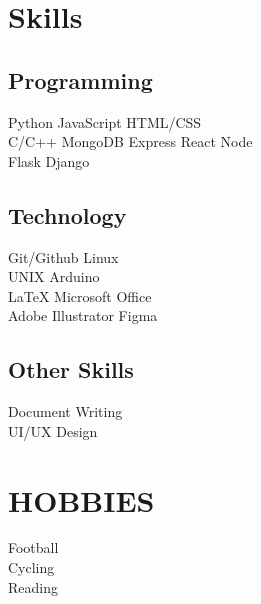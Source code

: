 \documentclass[]{resume}
\begin{document}
\begin{minipage}[t]{0.33\textwidth}

\bigskip

\section{Skills}
\subsection{Programming}
Python \textbullet{} JavaScript \textbullet{} HTML/CSS \\
 C/C++ \textbullet{} MongoDB \textbullet{} Express \textbullet{} React \textbullet{} Node  \\
Flask \textbullet{} Django \\
\sectionsep

\medskip

\subsection{Technology}
Git/Github \textbullet{} Linux \\
UNIX \textbullet{} Arduino \\
\LaTeX \textbullet{} Microsoft Office\\
Adobe Illustrator \textbullet{} Figma \\
\sectionsep

\subsection{Other Skills}
Document Writing \\
UI/UX Design \\

\bigskip
\bigskip


\section{HOBBIES}
Football\\
Cycling\\
Reading\\

\sectionsep
\bigskip
\bigskip


\end{minipage}
\end{document}
